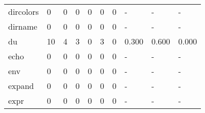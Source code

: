 \begin{longtable}{lp{2.0cm}p{2.0cm}p{2.0cm}p{2.0cm}p{2.0cm}p{2.0cm}p{2.0cm}p{2.0cm}p{2.0cm}}
dircolors &                      0 &                                  0 &                                 0 &                                0 &                                 0 &                               0 &                                    - &                                      - &                                    - \\
dirname   &                      0 &                                  0 &                                 0 &                                0 &                                 0 &                               0 &                                    - &                                      - &                                    - \\
du        &                     10 &                                  4 &                                 3 &                                0 &                                 3 &                               0 &                                0.300 &                                  0.600 &                                0.000 \\
echo      &                      0 &                                  0 &                                 0 &                                0 &                                 0 &                               0 &                                    - &                                      - &                                    - \\
env       &                      0 &                                  0 &                                 0 &                                0 &                                 0 &                               0 &                                    - &                                      - &                                    - \\
expand    &                      0 &                                  0 &                                 0 &                                0 &                                 0 &                               0 &                                    - &                                      - &                                    - \\
expr      &                      0 &                                  0 &                                 0 &                                0 &                                 0 &                               0 &                                    - &                                      - &                                    - \\

\end{longtable}
